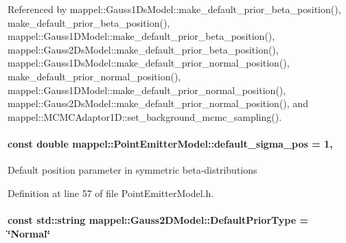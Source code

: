Referenced by mappel\+::\+Gauss1\+Ds\+Model\+::make\+\_\+default\+\_\+prior\+\_\+beta\+\_\+position(), make\+\_\+default\+\_\+prior\+\_\+beta\+\_\+position(), mappel\+::\+Gauss1\+D\+Model\+::make\+\_\+default\+\_\+prior\+\_\+beta\+\_\+position(), mappel\+::\+Gauss2\+Ds\+Model\+::make\+\_\+default\+\_\+prior\+\_\+beta\+\_\+position(), mappel\+::\+Gauss1\+Ds\+Model\+::make\+\_\+default\+\_\+prior\+\_\+normal\+\_\+position(), make\+\_\+default\+\_\+prior\+\_\+normal\+\_\+position(), mappel\+::\+Gauss1\+D\+Model\+::make\+\_\+default\+\_\+prior\+\_\+normal\+\_\+position(), mappel\+::\+Gauss2\+Ds\+Model\+::make\+\_\+default\+\_\+prior\+\_\+normal\+\_\+position(), and mappel\+::\+M\+C\+M\+C\+Adaptor1\+D\+::set\+\_\+background\+\_\+mcmc\+\_\+sampling().

\paragraph[{\texorpdfstring{default\+\_\+sigma\+\_\+pos}{default_sigma_pos}}]{\setlength{\rightskip}{0pt plus 5cm}const double mappel\+::\+Point\+Emitter\+Model\+::default\+\_\+sigma\+\_\+pos = 1\hspace{0.3cm}{\ttfamily [static]}, {\ttfamily [inherited]}}\hypertarget{classmappel_1_1PointEmitterModel_aa98a73b9e3937c00b07596d3928df3ca}{}\label{classmappel_1_1PointEmitterModel_aa98a73b9e3937c00b07596d3928df3ca}
Default position parameter in symmetric beta-\/distributions 

Definition at line 57 of file Point\+Emitter\+Model.\+h.

\paragraph[{\texorpdfstring{Default\+Prior\+Type}{DefaultPriorType}}]{\setlength{\rightskip}{0pt plus 5cm}const std\+::string mappel\+::\+Gauss2\+D\+Model\+::\+Default\+Prior\+Type = \char`\"{}Normal\char`\"{}\hspace{0.3cm}{\ttfamily [static]}}\hypertarget{classmappel_1_1Gauss2DModel_af4b934d290782da4f5f7e8e7e5090a94}{}\label{classmappel_1_1Gauss2DModel_af4b934d290782da4f5f7e8e7e5090a94}


